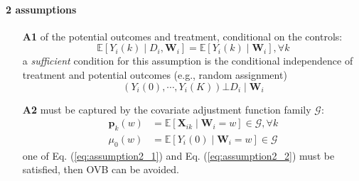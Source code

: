\documentclass[twoside]{article}
\begin{document}
\paragraph*{2 assumptions}
\begin{itemize}
    \item[\textbf{A1}]\label{assumption1}  of the potential outcomes and treatment, conditional on the controls:
    $$
    \mathbb{E}\left[Y_i(k)\mid D_i, \mathbf{W}_i\right] = \mathbb{E}\left[ Y_i(k) \mid \mathbf{W}_i \right],\forall k
    $$
    a \textit{sufficient} condition for this assumption is the conditional independence of treatment and potential outcomes (e.g., random assignment)
    \begin{equation*}
        \left(Y_i(0),\cdots,Y_i(K)\right) \bot D_i\mid \mathbf{W}_i
    \end{equation*}
    \item[\textbf{A2}]\label{assumption2}  must be captured by the covariate adjustment function family $\mathcal{G}$:
    \begin{align}
        \mathbf{p}_k\left( w \right) &= \mathbb{E}\left[\mathbf{X}_{ik}\mid \mathbf{W}_i = w\right] \in \mathcal{G},\forall k \label{eq:assumption2_1}\\
        \mu_0\left( w \right) &= \mathbb{E}\left[Y_i(0)\mid \mathbf{W}_i = w\right] \in \mathcal{G}\label{eq:assumption2_2}
    \end{align}
    one of Eq. (\ref{eq:assumption2_1}) and Eq. (\ref{eq:assumption2_2}) must be satisfied, then OVB can be avoided.
\end{itemize}
\end{document}
